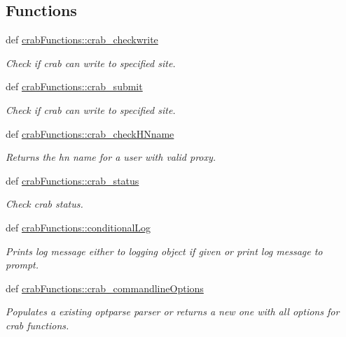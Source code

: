 \subsection*{Functions}
\begin{DoxyCompactItemize}
\item 
def \hyperlink{namespacecrabFunctions_a55e25531c2b4a607dadf5fcb2970dceb}{crabFunctions::crab\_\-checkwrite}
\begin{DoxyCompactList}\small\item\em Check if crab can write to specified site. \item\end{DoxyCompactList}\item 
def \hyperlink{namespacecrabFunctions_ab9c91e4a70a0d0461e58234b81cb64ce}{crabFunctions::crab\_\-submit}
\begin{DoxyCompactList}\small\item\em Check if crab can write to specified site. \item\end{DoxyCompactList}\item 
def \hyperlink{namespacecrabFunctions_a0bc64526ce391265d2283800e223b381}{crabFunctions::crab\_\-checkHNname}
\begin{DoxyCompactList}\small\item\em Returns the hn name for a user with valid proxy. \item\end{DoxyCompactList}\item 
def \hyperlink{namespacecrabFunctions_a2a705c16c7b45627e3c0d3b34e54fd2d}{crabFunctions::crab\_\-status}
\begin{DoxyCompactList}\small\item\em Check crab status. \item\end{DoxyCompactList}\item 
def \hyperlink{namespacecrabFunctions_a553ab7545078fd3ace358d831c4c640e}{crabFunctions::conditionalLog}
\begin{DoxyCompactList}\small\item\em Prints log message either to logging object if given or print log message to prompt. \item\end{DoxyCompactList}\item 
def \hyperlink{namespacecrabFunctions_af809a9785ae2db58eb64f2c67cb6d9ac}{crabFunctions::crab\_\-commandlineOptions}
\begin{DoxyCompactList}\small\item\em Populates a existing optparse parser or returns a new one with all options for crab functions. \item\end{DoxyCompactList}\end{DoxyCompactItemize}
